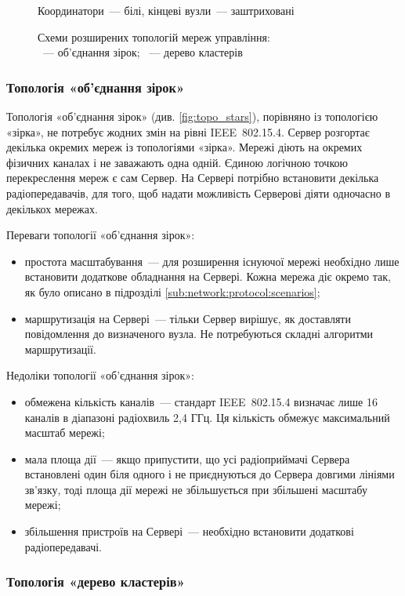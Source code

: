 \documentclass[a4paper,ukrainian,utf8,nocolumnsxix,floatsection,equationsection]{eskdtext}
\renewcommand\paragraph{\subsubsection}
\newcommand{\iee}[0]{IEEE~802.15.4\xspace}
\begin{document}
\begin{figure}[htb]
{{		}
	}
	\caption*{Координатори~--- білі, кінцеві вузли~--- заштриховані}
	\caption{\label{fig:expansion:topologies}Схеми розширених топологій мереж управління:\\
		\protect{}~--- об'єднання зірок; \protect{}~--- дерево кластерів
	}
\end{figure}

\paragraph{Топологія «об'єднання зірок»}

Топологія «об'єднання зірок» (див. \cref{fig:topo_stars}), порівняно із топологією «зірка», не потребує жодних змін на рівні \iee. Сервер розгортає декілька окремих мереж із топологіями «зірка». Мережі діють на окремих фізичних каналах і не заважають одна одній. Єдиною логічною точкою перекреслення мереж є сам Сервер. На Сервері потрібно встановити декілька радіопередавачів, для того, щоб надати можливість Серверові діяти одночасно в декількох мережах.

Переваги топології «об'єднання зірок»:
\begin{itemize}
	\item простота масштабування~--- для розширення існуючої мережі необхідно лише встановити додаткове обладнання на Сервері. Кожна мережа діє окремо так, як було описано в підрозділі \ref{sub:network:protocol:scenarios};
	\item маршрутизація на Сервері~--- тільки Сервер вирішує, як доставляти повідомлення до визначеного вузла. Не потребуються складні алгоритми маршрутизації.
\end{itemize}

Недоліки топології «об'єднання зірок»:
\begin{itemize}
	\item обмежена кількість каналів~--- стандарт \iee визначає лише 16 каналів в діапазоні радіохвиль 2,4 ГГц. Ця кількість обмежує максимальний масштаб мережі;
	\item мала площа дії~--- якщо припустити, що усі радіоприймачі Сервера встановлені один біля одного і не приєднуються до Сервера довгими лініями зв'язку, тоді площа дії мережі не збільшується при збільшені масштабу мережі;
	\item збільшення пристроїв на Сервері~--- необхідно встановити додаткові радіопередавачі.
\end{itemize}

\paragraph{Топологія «дерево кластерів»}
\end{document}
